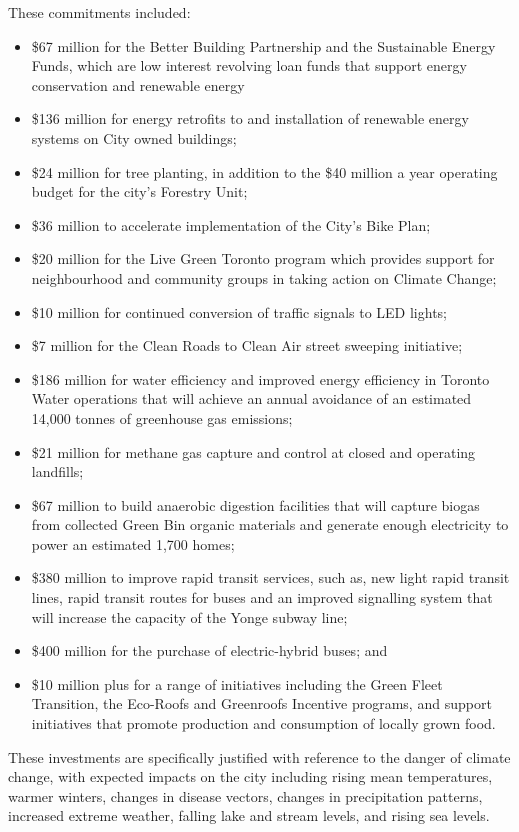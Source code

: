 These commitments included:
\begin{itemize}
	\item \$67 million for the Better Building Partnership and the Sustainable Energy Funds, which are low interest revolving loan funds that support energy conservation and renewable energy
	\item \$136 million for energy retrofits to and installation of renewable energy systems on City owned buildings; 
	\item \$24 million for tree planting, in addition to the \$40 million a year operating budget for the city's Forestry Unit; 
	\item \$36 million to accelerate implementation of the City's Bike Plan; 
	\item \$20 million for the Live Green Toronto program which provides support for neighbourhood and community groups in taking action on Climate Change; 
	\item \$10 million for continued conversion of traffic signals to LED lights; 
	\item \$7 million for the Clean Roads to Clean Air street sweeping initiative; 
	\item \$186 million for water efficiency and improved energy efficiency in Toronto Water operations that will achieve an annual avoidance of an estimated 14,000 tonnes of greenhouse gas emissions; 
	\item \$21 million for methane gas capture and control at closed and operating landfills; 
	\item \$67 million to build anaerobic digestion facilities that will capture biogas from collected Green Bin organic materials and generate enough electricity to power an estimated 1,700 homes; 
	\item \$380 million to improve rapid transit services, such as, new light rapid transit lines, rapid transit routes for buses and an improved signalling system that will increase the capacity of the Yonge subway line; 
	\item \$400 million for the purchase of electric-hybrid buses; and 
	\item \$10 million plus for a range of initiatives including the Green Fleet Transition, the Eco-Roofs and Greenroofs Incentive programs, and support initiatives that promote production and consumption of locally grown food.
\end{itemize}

These investments are specifically justified with reference to the danger of climate change, with expected impacts on the city including rising mean temperatures, warmer winters, changes in disease vectors, changes in precipitation patterns, increased extreme weather, falling lake and stream levels, and rising sea levels.\cite{TorontoEnvOff2008}

